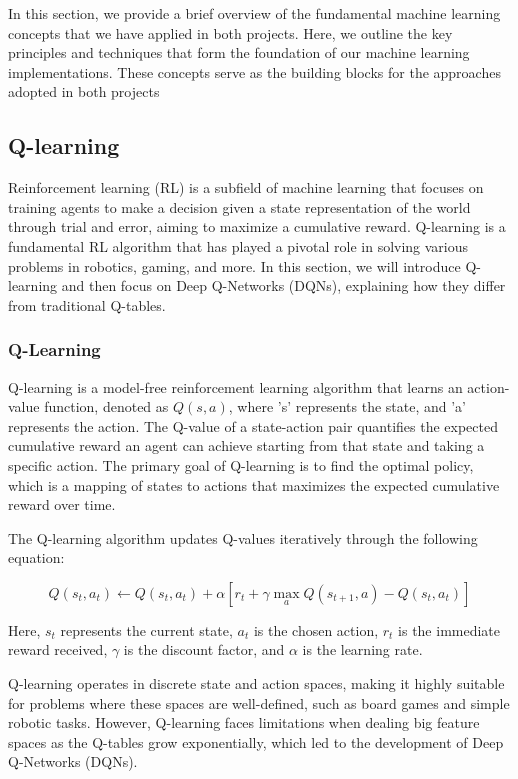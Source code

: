
In this section, we provide a brief overview of the fundamental machine learning concepts that we 
have applied in both projects. Here, we outline the key principles and techniques that form the foundation 
of our machine learning implementations. These concepts serve as the building blocks for the approaches adopted in both projects

\subsection{Q-learning}

Reinforcement learning (RL) is a subfield of machine learning that focuses on training agents to make a decision given a state representation of the world through trial and error, aiming to maximize a cumulative reward. Q-learning is a fundamental RL algorithm that has played a pivotal role in solving various problems in robotics, gaming, and more. In this section, we will introduce Q-learning and then focus on Deep Q-Networks (DQNs), explaining how they differ from traditional Q-tables.

\subsubsection{Q-Learning}

Q-learning is a model-free reinforcement learning algorithm that learns an action-value function, denoted as \(Q(s, a)\), where 's' represents the state, and 'a' represents the action. The Q-value of a state-action pair quantifies the expected cumulative reward an agent can achieve starting from that state and taking a specific action. The primary goal of Q-learning is to find the optimal policy, which is a mapping of states to actions that maximizes the expected cumulative reward over time.

The Q-learning algorithm updates Q-values iteratively through the following equation:

\begin{equation}
	Q(s_t, a_t) \leftarrow Q(s_t, a_t) + \alpha \left[ r_t + \gamma \max_a Q(s_{t+1}, a) - Q(s_t, a_t) \right]
\end{equation}

Here, \(s_t\) represents the current state, \(a_t\) is the chosen action, \(r_t\) is the immediate reward received, \(\gamma\) is the discount factor, and \(\alpha\) is the learning rate.

Q-learning operates in discrete state and action spaces, making it highly suitable for problems where these spaces are well-defined, such as board games and simple robotic tasks. However, Q-learning faces limitations when dealing big feature spaces as the Q-tables grow exponentially, which led to the development of Deep Q-Networks (DQNs).

